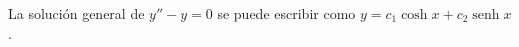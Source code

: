 \item La solución general de $y'' - y = 0$ se puede escribir como $y = c_1 \cosh x + c_2 \operatorname{senh} x$.
